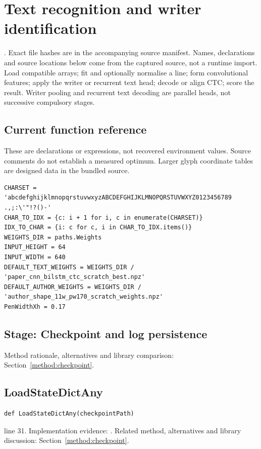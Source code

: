 \chapter{Text recognition and writer identification}\label{module:recognise}
. Exact file hashes are in the accompanying source manifest. Names, declarations and source locations below come from the captured source, not a runtime import.
Load compatible arrays; fit and optionally normalise a line; form convolutional features; apply the writer or recurrent text head; decode or align CTC; score the result. Writer pooling and recurrent text decoding are parallel heads, not successive compulsory stages.



\section*{Current function reference}
These are declarations or expressions, not recovered environment values. Source comments do not establish a measured optimum. Larger glyph coordinate tables are designed data in the bundled source.
\begin{lstlisting}[style=plain]
CHARSET = 'abcdefghijklmnopqrstuvwxyzABCDEFGHIJKLMNOPQRSTUVWXYZ0123456789 .,;:\'"!?()-'
CHAR_TO_IDX = {c: i + 1 for i, c in enumerate(CHARSET)}
IDX_TO_CHAR = {i: c for c, i in CHAR_TO_IDX.items()}
WEIGHTS_DIR = paths.Weights
INPUT_HEIGHT = 64
INPUT_WIDTH = 640
DEFAULT_TEXT_WEIGHTS = WEIGHTS_DIR / 'paper_cnn_bilstm_ctc_scratch_best.npz'
DEFAULT_AUTHOR_WEIGHTS = WEIGHTS_DIR / 'author_shape_11w_pw170_scratch_weights.npz'
PenWidthXh = 0.17
\end{lstlisting}
\section*{Stage: Checkpoint and log persistence}
Method rationale, alternatives and library comparison: Section~\ref{method:checkpoint}.
\section{LoadStateDictAny}\label{fn:recognise:LoadStateDictAny}
\begin{lstlisting}[style=sig]
def LoadStateDictAny(checkpointPath)
\end{lstlisting}
 line 31. Implementation evidence: \cite{code2026}. Related method, alternatives and library discussion: Section~\ref{method:checkpoint}.


